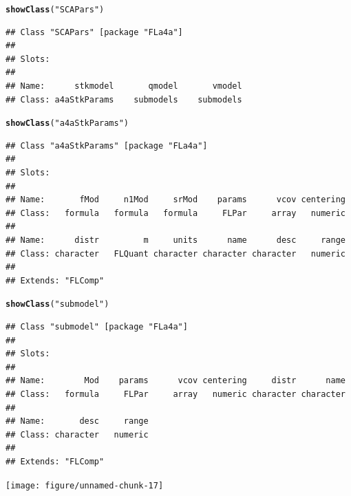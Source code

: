 \documentclass[a4paper,english,10pt]{article}\usepackage[]{graphicx}\usepackage[]{color}
\makeatletter
\newcommand{\hlstr}[1]{\textcolor[rgb]{0.192,0.494,0.8}{#1}}%
\newcommand{\hlstd}[1]{\textcolor[rgb]{0.345,0.345,0.345}{#1}}%
\newcommand{\hlkwd}[1]{\textcolor[rgb]{0.737,0.353,0.396}{\textbf{#1}}}%
\newenvironment{kframe}{%
 \def\at@end@of@kframe{}%
 \ifinner\ifhmode%
  \def\at@end@of@kframe{\end{minipage}}%
  \begin{minipage}{\columnwidth}%
 \fi\fi%
 \def\FrameCommand##1{\hskip\@totalleftmargin \hskip-\fboxsep
 \colorbox{shadecolor}{##1}\hskip-\fboxsep
     \hskip-\linewidth \hskip-\@totalleftmargin \hskip\columnwidth}%
 \MakeFramed {\advance\hsize-\width
   \@totalleftmargin\z@ \linewidth\hsize
   \@setminipage}}%
 {\par\unskip\endMakeFramed%
 \at@end@of@kframe}
\newenvironment{knitrout}{}{} %
\makeatother
\begin{document}
\begin{knitrout}
\color{fgcolor}\begin{kframe}
\begin{alltt}
\hlkwd{showClass}\hlstd{(}\hlstr{"SCAPars"}\hlstd{)}
\end{alltt}
\begin{verbatim}
## Class "SCAPars" [package "FLa4a"]
## 
## Slots:
##                                              
## Name:      stkmodel       qmodel       vmodel
## Class: a4aStkParams    submodels    submodels
\end{verbatim}
\begin{alltt}
\hlkwd{showClass}\hlstd{(}\hlstr{"a4aStkParams"}\hlstd{)}
\end{alltt}
\begin{verbatim}
## Class "a4aStkParams" [package "FLa4a"]
## 
## Slots:
##                                                                   
## Name:       fMod     n1Mod     srMod    params      vcov centering
## Class:   formula   formula   formula     FLPar     array   numeric
##                                                                   
## Name:      distr         m     units      name      desc     range
## Class: character   FLQuant character character character   numeric
## 
## Extends: "FLComp"
\end{verbatim}
\begin{alltt}
\hlkwd{showClass}\hlstd{(}\hlstr{"submodel"}\hlstd{)}
\end{alltt}
\begin{verbatim}
## Class "submodel" [package "FLa4a"]
## 
## Slots:
##                                                                   
## Name:        Mod    params      vcov centering     distr      name
## Class:   formula     FLPar     array   numeric character character
##                           
## Name:       desc     range
## Class: character   numeric
## 
## Extends: "FLComp"
\end{verbatim}
\end{kframe}
\end{knitrout}


\begin{knitrout}
\color{fgcolor}

{\centering \texttt{[image: figure/unnamed-chunk-17]} 

}



\end{knitrout}
\end{document}
